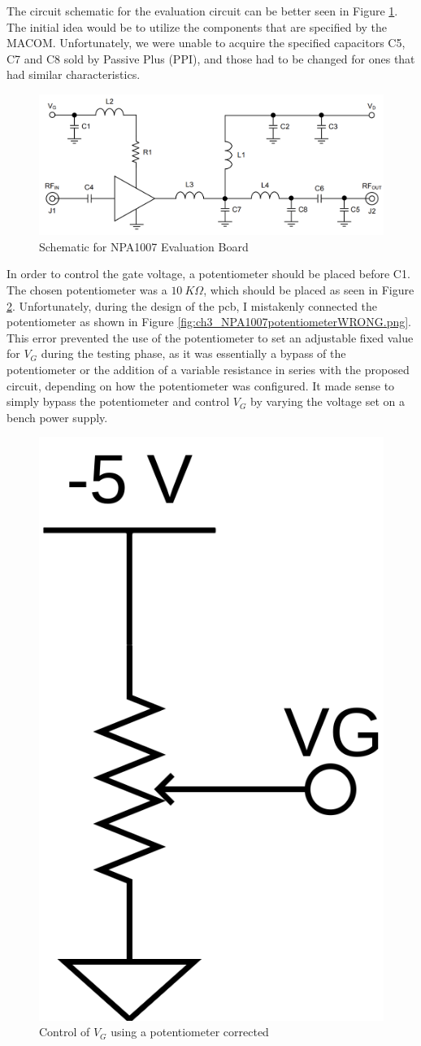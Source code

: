 \par The circuit schematic for the evaluation circuit can be better seen in Figure \ref{fig:ch3_NPA1007schematic.png}. The initial idea would be to utilize the components that are specified by the MACOM. Unfortunately, we were unable to acquire the specified capacitors C5, C7 and C8 sold by Passive Plus (PPI), and those had to be changed for ones that had similar characteristics.

\begin{figure}[H]
    \vspace*{0cm}
    \centering
    \includegraphics[width=0.9\linewidth]{figs/ch3_NPA1007schematic.png}
    \caption{Schematic for NPA1007 Evaluation Board \cite{NPA1007}}
    \label{fig:ch3_NPA1007schematic.png}
\end{figure}


\par In order to control the gate voltage, a potentiometer should be placed before C1. The chosen potentiometer was a $10\:\si{K\Omega}$, which should be placed as seen in Figure \ref{fig:ch3_NPA1007potentiometer.png}. Unfortunately, during the design of the \ac{pcb}, I mistakenly connected the potentiometer as shown in Figure \ref{fig:ch3_NPA1007potentiometerWRONG.png}. This error prevented the use of the potentiometer to set an adjustable fixed value for $V_{G}$ during the testing phase, as it was essentially a bypass of the potentiometer or the addition of a variable resistance in series with the proposed circuit, depending on how the potentiometer was configured. It made sense to simply bypass the potentiometer and control $V_{G}$ by varying the voltage set on a bench power supply.

\begin{figure}[H]
    \vspace*{0cm}
    \centering
    \includegraphics[width=0.12\linewidth]{figs/ch3_NPA1007potentiometer.png}
    \caption{Control of $V_{G}$ using a potentiometer corrected}
    \label{fig:ch3_NPA1007potentiometer.png}
\end{figure}

